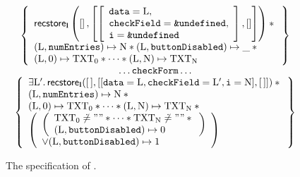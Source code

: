 \documentclass{article}
\begin{document}
\begin{figure}\scriptsize
        \[\begin{array}{c}
                \left\{\begin{array}{l}
                        \recstore_{\ls}\left(\left[\right],\left[\left[\begin{array}{l}\js{data}=\V{L},\\
                                        \js{checkField}=\undef,\\
                                        \js{i}=\undef
                                \end{array} \right],\left[\right]\right]\right) \sep {}\\
                        (\V{L},\js{numEntries})\pointsto\V{N} \sep (\V{L},\js{buttonDisabled}) \pointsto \_ \sep {}\\
                        (\V{L},0)\pointsto\V{TXT}_0 \sep \dots \sep (\V{L},\V{N})\pointsto\V{TXT}_{\V{N}}
                \end{array}\right\}\\
                \dots\js{checkForm}\dots\\
                \left\{\begin{array}{l}
                        \exists\V{L}'\st\recstore_{\ls}({\emptylist},[[\js{data}=\V{L},\js{checkField}=\V{L}',\js{i}=\V{N}],{\emptylist}]) \sep {}\\
                        (\V{L},\js{numEntries})\pointsto\V{N} \sep {}\\
                        (\V{L},0)\pointsto\V{TXT}_0 \sep \dots \sep (\V{L},\V{N})\pointsto\V{TXT}_{\V{N}} \sep{} \\
                        \left(\begin{array}{l}
                                \left(\begin{array}{l}
                                        \V{TXT}_0\not\doteq"" \sep \dots \sep \V{TXT}_{\V{N}}\not\doteq"" \sep {}\\
                                        (\V{L},\js{buttonDisabled}) \pointsto 0
                                \end{array}\right)\\
                                \lor (\V{L},\js{buttonDisabled})\pointsto 1
                        \end{array}\right)
                \end{array}\right\}
        \end{array}\]
        \caption{The specification of .}
        \label{fig:spec:formvalid}
\end{figure}
\end{document}

